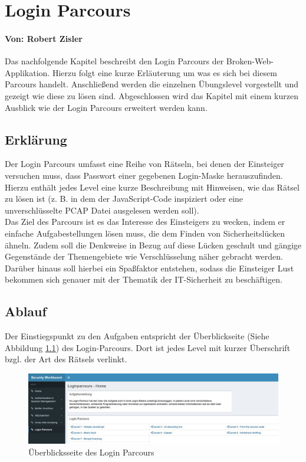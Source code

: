 \chapter{Login Parcours}
\subsubsection*{Von: Robert Zisler}
Das nachfolgende Kapitel beschreibt den Login Parcours der Broken-Web-Applikation. Hierzu folgt eine kurze Erläuterung um was es sich bei diesem Parcours handelt. Anschließend werden die einzelnen Übungslevel vorgestellt und gezeigt wie diese zu lösen sind. Abgeschlossen wird das Kapitel mit einem kurzen Ausblick  wie der Login Parcours erweitert werden kann. 

\section{Erklärung}
Der Login Parcours umfasst eine Reihe von Rätseln, bei denen der Einsteiger versuchen muss, dass Passwort einer gegebenen Login-Maske herauszufinden. Hierzu enthält jedes Level eine kurze Beschreibung mit Hinweisen, wie das Rätsel zu lösen ist (z. B. in dem der JavaScript-Code inspiziert oder eine unverschlüsselte PCAP Datei ausgelesen werden soll). \\ 
Das Ziel des Parcours ist es das Interesse des Einsteigers zu wecken, indem er einfache Aufgabestellungen lösen muss, die dem Finden von Sicherheitslücken ähneln. Zudem soll die Denkweise in Bezug auf diese Lücken geschult und gängige Gegenstände der Themengebiete wie Verschlüsselung näher gebracht werden. Darüber hinaus soll hierbei ein Spaßfaktor entstehen, sodass die Einsteiger Lust bekommen sich genauer mit der Thematik der IT-Sicherheit zu beschäftigen. 

\section{Ablauf}
Der Einstiegspunkt zu den Aufgaben entspricht der Überblickseite (Siehe Abbildung \ref{fig:login-parcours-hauptseite}) des Login-Parcours. Dort ist jedes Level mit kurzer Überschrift bzgl. der Art des Rätsels verlinkt.

\begin{figure}[H]
	\centering
	\includegraphics[width=\textwidth]{images/LoginParcours/login_parcours_hauptseite.jpg}
	\caption{Überblicksseite des Login Parcours}
	\label{fig:login-parcours-hauptseite}
\end{figure}

